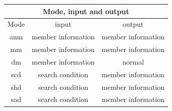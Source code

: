 \batchmode
{}
\makeatletter

\makeatother
\newenvironment{tex2html_wrap}{}{}
\newwrite\lthtmlwrite
\def\lthtmltypeout#1{{\let\protect\string\immediate\write\lthtmlwrite{#1}}}%
\newbox\sizebox

\pagestyle{empty}
{\newpage
\clearpage
\samepage \begin{tabular}{|c|c|c|} \hline
\multicolumn{3}{|c|}{\bf Mode, input and output} \\  \hline\hline
\multicolumn{1}{|c|}{Mode} & {input} & {output} \\  \hline
anm & member information & member information \\  \hline
mm  & member information & member information \\  \hline
dm  & member information & normal \\  \hline
scd & search condition & member information \\  \hline
shd & search condition & member information \\  \hline
sad & search condition & member information \\  \hline
\end{tabular}
}



